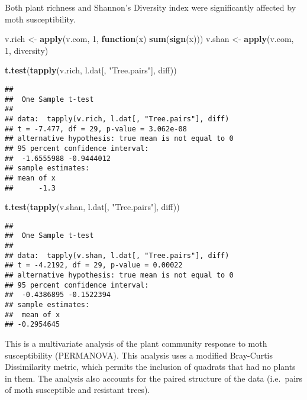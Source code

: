 \documentclass[]{article}
\newenvironment{Shaded}{\begin{snugshade}}{\end{snugshade}}
\newcommand{\KeywordTok}[1]{\textcolor[rgb]{0.13,0.29,0.53}{\textbf{#1}}}
\newcommand{\DecValTok}[1]{\textcolor[rgb]{0.00,0.00,0.81}{#1}}
\newcommand{\StringTok}[1]{\textcolor[rgb]{0.31,0.60,0.02}{#1}}
\newcommand{\ControlFlowTok}[1]{\textcolor[rgb]{0.13,0.29,0.53}{\textbf{#1}}}
\newcommand{\NormalTok}[1]{#1}
\begin{document}
Both plant richness and Shannon's Diversity index were significantly
affected by moth susceptibility.

\begin{Shaded}
\begin{Highlighting}[]
\NormalTok{v.rich <-}\StringTok{ }\KeywordTok{apply}\NormalTok{(v.com, }\DecValTok{1}\NormalTok{, }\ControlFlowTok{function}\NormalTok{(x) }\KeywordTok{sum}\NormalTok{(}\KeywordTok{sign}\NormalTok{(x)))}
\NormalTok{v.shan <-}\StringTok{ }\KeywordTok{apply}\NormalTok{(v.com, }\DecValTok{1}\NormalTok{, diversity)}

\KeywordTok{t.test}\NormalTok{(}\KeywordTok{tapply}\NormalTok{(v.rich, l.dat[, }\StringTok{"Tree.pairs"}\NormalTok{], diff))}
\end{Highlighting}
\end{Shaded}

\begin{verbatim}
## 
##  One Sample t-test
## 
## data:  tapply(v.rich, l.dat[, "Tree.pairs"], diff)
## t = -7.477, df = 29, p-value = 3.062e-08
## alternative hypothesis: true mean is not equal to 0
## 95 percent confidence interval:
##  -1.6555988 -0.9444012
## sample estimates:
## mean of x 
##      -1.3
\end{verbatim}

\begin{Shaded}
\begin{Highlighting}[]
\KeywordTok{t.test}\NormalTok{(}\KeywordTok{tapply}\NormalTok{(v.shan, l.dat[, }\StringTok{"Tree.pairs"}\NormalTok{], diff))}
\end{Highlighting}
\end{Shaded}

\begin{verbatim}
## 
##  One Sample t-test
## 
## data:  tapply(v.shan, l.dat[, "Tree.pairs"], diff)
## t = -4.2192, df = 29, p-value = 0.00022
## alternative hypothesis: true mean is not equal to 0
## 95 percent confidence interval:
##  -0.4386895 -0.1522394
## sample estimates:
##  mean of x 
## -0.2954645
\end{verbatim}

This is a multivariate analysis of the plant community response to moth
susceptibility (PERMANOVA). This analysis uses a modified Bray-Curtis
Dissimilarity metric, which permits the inclusion of quadrats that had
no plants in them. The analysis also accounts for the paired structure
of the data (i.e.~pairs of moth susceptible and resistant trees).
\end{document}
